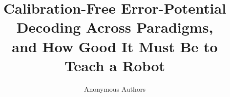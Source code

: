 \documentclass{article}
\title{Calibration-Free Error-Potential Decoding Across Paradigms,\\
and How Good It Must Be to Teach a Robot}
\author{Anonymous Authors}
\begin{document}
\maketitle

\begin{abstract}

\end{abstract}













\appendix

\end{document}
